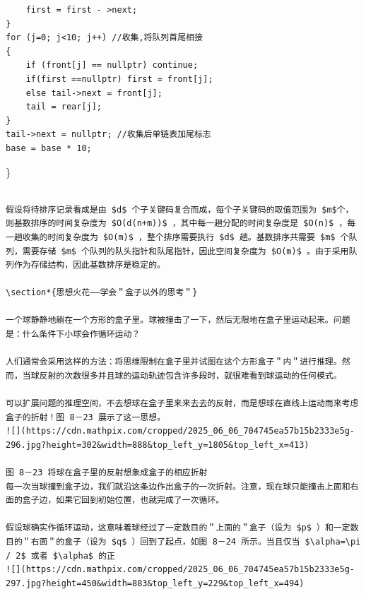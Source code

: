 \documentclass[10pt]{article}
\begin{document}
\begin{verbatim}

\end{verbatim}

\begin{verbatim}
    first = first - >next;
}
for (j=0; j<10; j++) //收集,将队列首尾相接
{
    if (front[j] == nullptr) continue;
    if(first ==nullptr) first = front[j];
    else tail->next = front[j];
    tail = rear[j];
}
tail->next = nullptr; //收集后单链表加尾标志
base = base * 10;
\end{verbatim}

\}

\begin{verbatim}

假设将待排序记录看成是由 $d$ 个子关键码复合而成，每个子关键码的取值范围为 $m$个，则基数排序的时间复杂度为 $O(d(n+m))$ ，其中每一趟分配的时间复杂度是 $O(n)$ ，每一趟收集的时间复杂度为 $O(m)$ ，整个排序需要执行 $d$ 趟。基数排序共需要 $m$ 个队列，需要存储 $m$ 个队列的队头指针和队尾指针，因此空间复杂度为 $O(m)$ 。由于采用队列作为存储结构，因此基数排序是稳定的。

\section*{思想火花——学会＂盒子以外的思考＂}

一个球静静地躺在一个方形的盒子里。球被撞击了一下，然后无限地在盒子里运动起来。问题是：什么条件下小球会作循环运动？

人们通常会采用这样的方法：将思维限制在盒子里并试图在这个方形盒子＂内＂进行推理。然而，当球反射的次数很多并且球的运动轨迹包含许多段时，就很难看到球运动的任何模式。

可以扩展问题的推理空间，不去想球在盒子里来来去去的反射，而是想球在直线上运动而来考虑盒子的折射！图 8－23 展示了这一思想。
![](https://cdn.mathpix.com/cropped/2025_06_06_704745ea57b15b2333e5g-296.jpg?height=302&width=888&top_left_y=1805&top_left_x=413)

图 8－23 将球在盒子里的反射想象成盒子的相应折射
每一次当球撞到盒子边，我们就沿这条边作出盒子的一次折射。注意，现在球只能撞击上面和右面的盒子边，如果它回到初始位置，也就完成了一次循环。

假设球确实作循环运动，这意味着球经过了一定数目的＂上面的＂盒子（设为 $p$ ）和一定数目的＂右面＂的盒子（设为 $q$ ）回到了起点，如图 8－24 所示。当且仅当 $\alpha=\pi / 2$ 或者 $\alpha$ 的正
![](https://cdn.mathpix.com/cropped/2025_06_06_704745ea57b15b2333e5g-297.jpg?height=450&width=883&top_left_y=229&top_left_x=494)


\end{verbatim}
\end{document}
